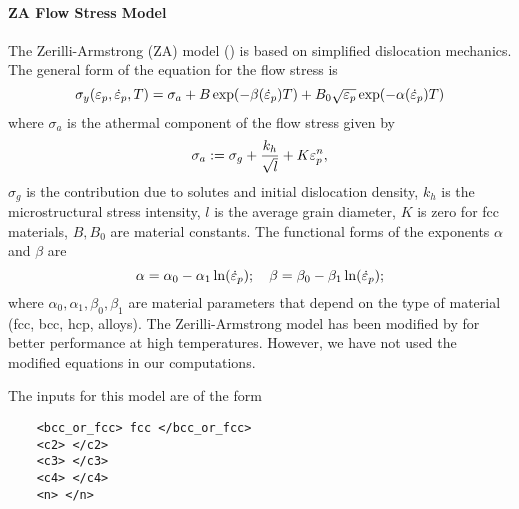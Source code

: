   \paragraph{ZA Flow Stress Model}
  The Zerilli-Armstrong (ZA) model (\cite{Zerilli1987,Zerilli1993,Zerilli2004}) 
  is based on simplified dislocation mechanics.  The general form of the
  equation for the flow stress is
  \begin{equation}
    \sigma_y(\varepsilon_p,\dot{\varepsilon}_{p},T) = 
      \sigma_a + B\exp(-\beta(\dot{\varepsilon}_{p}) T) + 
                           B_0\sqrt{\varepsilon_p}\exp(-\alpha(\dot{\varepsilon}_{p}) T)
  \end{equation}
  where $\sigma_a$ is the athermal component of the flow stress given by
  \begin{equation}
    \sigma_a := \sigma_g + \frac{k_h}{\sqrt{l}} + K\varepsilon_p^n,
  \end{equation}
  $\sigma_g$ is the contribution due to solutes and initial dislocation
  density, $k_h$ is the microstructural stress intensity, $l$ is the 
  average grain diameter, $K$ is zero for fcc materials, 
  $B, B_0$ are material constants.  The functional forms of the exponents 
  $\alpha$ and $\beta$ are 
  \begin{equation}
    \alpha = \alpha_0 - \alpha_1 \ln(\dot{\varepsilon}_{p}); \quad
    \beta = \beta_0 - \beta_1 \ln(\dot{\varepsilon}_{p}); 
  \end{equation}
  where $\alpha_0, \alpha_1, \beta_0, \beta_1$ are material parameters that
  depend on the type of material (fcc, bcc, hcp, alloys).  The Zerilli-Armstrong
  model has been modified by \cite{Abed2005} for better performance at high 
  temperatures.  However, we have not used the modified equations in our
  computations.

  The inputs for this model are of the form
  \lstset{language=XML}
  \begin{lstlisting}
    <bcc_or_fcc> fcc </bcc_or_fcc>
    <c2> </c2>
    <c3> </c3>
    <c4> </c4>
    <n> </n>
  \end{lstlisting}

